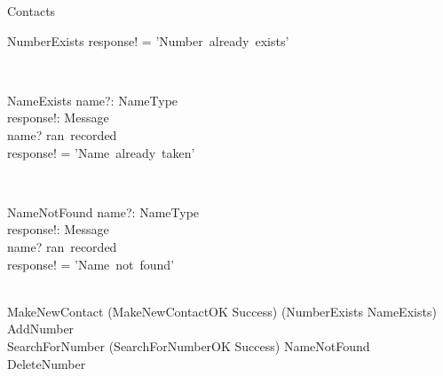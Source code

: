 \begin{class}{Contacts}
\begin{op}{NumberExists}
response! = 'Number~already~exists'
\end{op}\
\zbreak
\begin{op}{NameExists}
name?: NameType \\
response!: Message \\
\ST
name? \in ran~recorded \\
response! = 'Name~already~taken'
\end{op}\\
\begin{op}{NameNotFound}
    name?: NameType \\
    response!: Message \\
    \ST
    name? \notin ran~recorded \\
    response! = 'Name~not~found'
\end{op}\\
\also
MakeNewContact \sdef (MakeNewContactOK \wedge Success) \oplus (NumberExists \lor NameExists) \\
AddNumber \sdef \\
SearchForNumber \sdef (SearchForNumberOK \wedge Success) \vee NameNotFound \\
DeleteNumber \sdef
\end{class}
